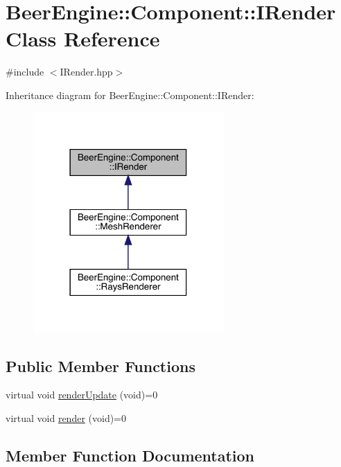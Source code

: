 \hypertarget{class_beer_engine_1_1_component_1_1_i_render}{}\section{Beer\+Engine\+:\+:Component\+:\+:I\+Render Class Reference}
\label{class_beer_engine_1_1_component_1_1_i_render}


{\ttfamily \#include $<$I\+Render.\+hpp$>$}



Inheritance diagram for Beer\+Engine\+:\+:Component\+:\+:I\+Render\+:
\nopagebreak
\begin{figure}[H]
\begin{center}
\leavevmode
\includegraphics[width=206pt]{class_beer_engine_1_1_component_1_1_i_render__inherit__graph}
\end{center}
\end{figure}
\subsection*{Public Member Functions}
\begin{DoxyCompactItemize}
\item 
virtual void \mbox{\hyperlink{class_beer_engine_1_1_component_1_1_i_render_aef1ff4ddcdf216d290c747edd86bd99e}{render\+Update}} (void)=0
\item 
virtual void \mbox{\hyperlink{class_beer_engine_1_1_component_1_1_i_render_a021864acc1288b34b13f8766735ebcc0}{render}} (void)=0
\end{DoxyCompactItemize}


\subsection{Member Function Documentation}
\mbox{\label{class_beer_engine_1_1_component_1_1_i_render_a021864acc1288b34b13f8766735ebcc0}} 

